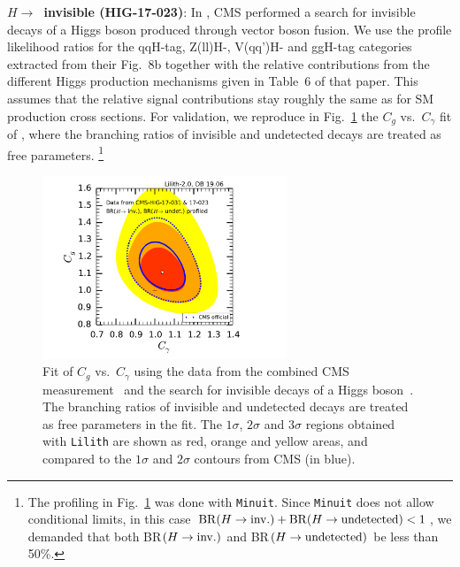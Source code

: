 {\bf\boldmath $H\to$~invisible (HIG-17-023)}: 
In \cite{Sirunyan:2018owy}, CMS performed a search for invisible decays of a Higgs boson produced through vector boson fusion. 
We use the profile likelihood ratios for the qqH-tag, Z(ll)H-, V(qq')H- and ggH-tag categories extracted 
from their Fig.~8b together with the relative contributions from the different Higgs production mechanisms  
given in Table~6 of that paper. This assumes that the relative signal contributions stay roughly the same as for 
SM production cross sections. For validation, we reproduce in Fig.~\ref{fig:validation_cms_inv}
 the $C_g$ vs.\ $C_\gamma$ fit of \cite{Sirunyan:2018koj}, where the branching ratios of invisible and undetected decays 
are treated as free parameters.%
\footnote{The profiling in Fig.~\ref{fig:validation_cms_inv} was done with {\tt Minuit}. 
  Since {\tt Minuit} does not allow conditional limits, in this case ${\rm BR}(H\to {\rm inv.})+{\rm BR}(H\to {\rm undetected})<1$, 
  we demanded that both BR$(H\to {\rm inv.})$ and BR$(H\to {\rm undetected})$ be less than 50\%.} 

\begin{figure}[h!]\centering
\includegraphics[width=0.65\textwidth]{validation/CMS/HIG-17-031-CgCGa_BRinvBRund_profiled.pdf}%
\vspace*{-2mm}
\caption{Fit of $C_g$ vs.\ $C_\gamma$ using the data from the combined CMS measurement~\cite{Sirunyan:2018koj} and the 
search for invisible decays of a Higgs boson~\cite{Sirunyan:2018owy}. The branching ratios of invisible and undetected decays 
are treated as free parameters in the fit. 
The  $1\sigma$,  $2\sigma$ and $3\sigma$ regions obtained with {\tt Lilith} are shown as red, orange and yellow areas, 
and compared to the $1\sigma$ and $2\sigma$ contours from CMS (in blue).}
\label{fig:validation_cms_inv}
\end{figure}

